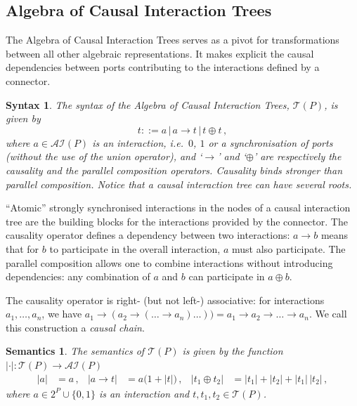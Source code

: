 \documentclass{llncs}
\newcommand{\ie}[1][\ ]{i.e.#1}
\newtheorem*{syntax}{Syntax}
\newtheorem*{semantics}{Semantics}
\newcommand{\ai}{\ensuremath{\mathcal{AI}}}
\newcommand{\ct}{\ensuremath{\mathcal{T}}}
\begin{document}

\subsection{Algebra of Causal Interaction Trees}
\label{secn:trees}

The Algebra of Causal Interaction Trees serves as a pivot for
transformations between all other algebraic representations.  It makes
explicit the causal dependencies between ports contributing to the
interactions defined by a connector.  

\begin{syntax}
The syntax of the \emph{Algebra of Causal Interaction Trees}, $\ct(P)$, is
given by
\begin{equation} \label{eq:ctsyn}
  t ::= a \,|\, a \rightarrow t \,|\, t\oplus t\,,
\end{equation}
where $a \in \ai(P)$ is an interaction, \ie $0$, $1$ or a
synchronisation of ports (without the use of the union operator), and
`$\rightarrow$' and `$\oplus$' are respectively the {\em causality}
and the {\em parallel composition} operators.  Causality binds
stronger than parallel composition.  Notice that a causal interaction
tree can have several roots.
\end{syntax}

``Atomic'' strongly synchronised interactions in the nodes of a causal
interaction tree are the building blocks for the interactions provided
by the connector.  The causality operator defines a dependency between
two interactions: $a \rightarrow b$ means that for $b$ to
participate in the overall interaction, $a$ must also participate.
The parallel composition allows one to combine interactions without
introducing dependencies: any combination of $a$
and $b$ can participate in $a \oplus b$.

The causality operator is right- (but not left-) associative: for
interactions $a_1,\dots,a_n$, we have $a_1 \rightarrow (a_2
\rightarrow (\dots \rightarrow a_n)\dots)) = a_1 \rightarrow a_2
\rightarrow \dots \rightarrow a_n$.  We call this construction a {\em
  causal chain}.

\begin{semantics}
The semantics of $\ct(P)$ is given by the function $|\cdot|: \ct(P)
\rightarrow \ai(P)$
\begin{align}
  \label{eq:ctsem}
  |a| & = a\,,
  & |a \rightarrow t| & = a\Big(1 + |t|\Big)\,,
  & |t_1 \oplus t_2| & = |t_1| + |t_2| + |t_1|\,|t_2|\,,
\end{align}
where $a\in 2^P \cup \{0,1\}$ is an interaction and $t, t_1, t_2 \in \ct(P)$.
\end{semantics}
\end{document}
